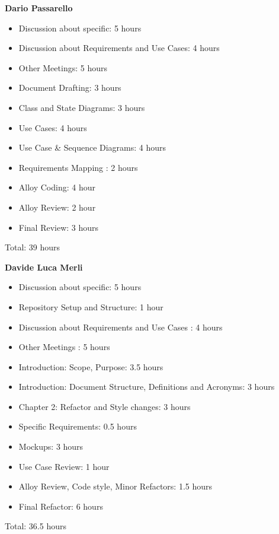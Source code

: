 \textbf{Dario Passarello}
\begin{itemize}
    \item Discussion about specific: 5 hours
    \item Discussion about Requirements and Use Cases: 4 hours
    \item Other Meetings: 5 hours
    \item Document Drafting: 3 hours
    \item Class and State Diagrams: 3 hours
    \item Use Cases: 4 hours
    \item Use Case \& Sequence Diagrams: 4 hours
    \item Requirements Mapping : 2 hours
    \item Alloy Coding: 4 hour
    \item Alloy Review: 2 hour
    \item Final Review: 3 hours
\end{itemize}

Total: 39 hours

\bigskip

\textbf{Davide Luca Merli}

\begin{itemize}
    \item Discussion about specific: 5 hours
    \item Repository Setup and Structure: 1 hour
    \item Discussion about Requirements and Use Cases : 4 hours
    \item Other Meetings : 5 hours
    \item Introduction: Scope, Purpose: 3.5 hours
    \item Introduction: Document Structure, Definitions and Acronyms: 3 hours
    \item Chapter 2: Refactor and Style changes: 3 hours
    \item Specific Requirements: 0.5 hours
    \item Mockups: 3 hours
    \item Use Case Review: 1 hour
    \item Alloy Review, Code style, Minor Refactors: 1.5 hours
    \item Final Refactor: 6 hours
\end{itemize}

Total: 36.5 hours